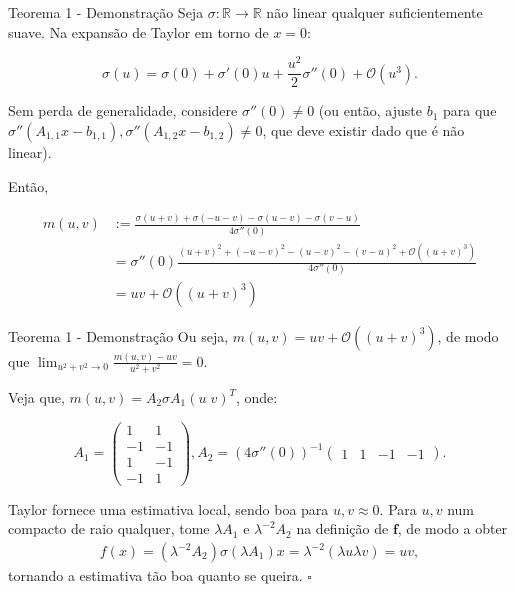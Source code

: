 \documentclass{beamer}
\begin{document}
\begin{frame}{Teorema 1 - Demonstração}
    \small
    Seja $\sigma:\mathbb R \to \mathbb R$ não linear qualquer suficientemente suave. Na expansão de Taylor em torno de $x=0$:

    \[
        \sigma(u) = \sigma(0) + \sigma'(0)u + \frac{u^2}{2} \sigma''(0) + \mathcal O(u^3).
    \]

    Sem perda de generalidade, considere $\sigma''(0) \neq 0$ (ou então, ajuste $b_1$ para que $\sigma''(A_{1,1}x-b_{1,1}),\sigma''(A_{1,2}x-b_{1,2})\neq0$, que deve existir dado que é não linear). 

    \vspace{1em}
    \pause

    Então,

    \begin{align*}
        m(u,v) &:= \frac{\sigma(u+v)+\sigma(-u-v)-\sigma(u-v)-\sigma(v-u)}{4\sigma''(0)} \\ 
        &= \sigma''(0) \frac{(u+v)^2 + (-u-v)^2 - (u-v)^2 - (v-u)^2  + \mathcal O((u+v)^3)}{4\sigma''(0)}  \\
        &= uv + \mathcal O((u+v)^3)
    \end{align*}
\end{frame}


\begin{frame}{Teorema 1 - Demonstração}
    \small
    Ou seja, $m(u,v) = uv + \mathcal O((u+v)^3)$, de modo que $\lim_{u^2+v^2 \to 0} \frac{m(u,v)-uv}{u^2+v^2} = 0$. 
    
    \pause

    Veja que, $m(u,v) = A_2 \sigma A_1 (u \; v)^T$, onde:

    \begin{equation*}
        A_1 = \begin{pmatrix}
            1 & 1 \\
            -1 & -1 \\
            1 & -1 \\
            -1 & 1
        \end{pmatrix},
        A_2 = (4\sigma''(0))^{-1} \begin{pmatrix}
            1 & 1 & -1 & -1
        \end{pmatrix}.
    \end{equation*}

    \pause
    \vspace{1em}

    Taylor fornece uma estimativa local, sendo boa para $u,v \approx 0$. Para $u,v$ num compacto de raio qualquer, tome $\lambda A_1$ e $\lambda^{-2}A_2$ na definição de $\mathbf f$, de modo a obter
    \begin{align*}
        f(x) = (\lambda^{-2}A_2)\sigma(\lambda A_1)x = \lambda^{-2} ( \lambda u \lambda v) = uv,
    \end{align*}
    tornando a estimativa tão boa quanto se queira. $\square$
\end{frame}
\end{document}
